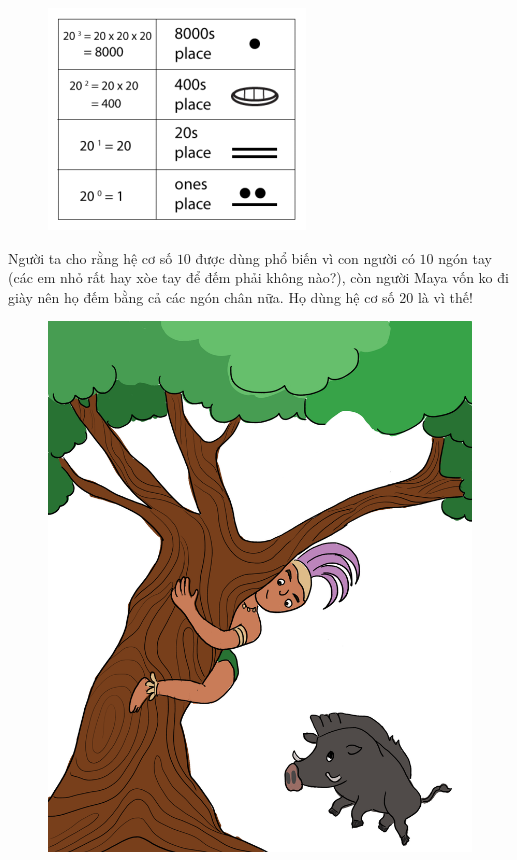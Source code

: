 	\begin{multicols}{2}
		\begin{figure}[H]
			\centering
			\vspace*{-5pt}
			\captionsetup{labelformat= empty, justification=centering}
			\includegraphics[width=0.8\linewidth]{32}
			\vspace*{-10pt}
		\end{figure}
		\vskip 0.1cm
		Người ta cho rằng hệ cơ số $10$ được dùng phổ biến vì con người có $10$ ngón tay (các em nhỏ rất hay xòe tay để đếm phải không nào?),  còn người Maya vốn ko đi giày nên họ đếm bằng cả các ngón chân nữa. Họ dùng hệ cơ số $20$ là vì thế!
		\begin{figure}[H]
			\centering
			\vspace*{-15pt}
			\captionsetup{labelformat= empty, justification=centering}
			\includegraphics[width=0.8\linewidth]{20.12-pi.4-2}
		\end{figure}
	\end{multicols}
